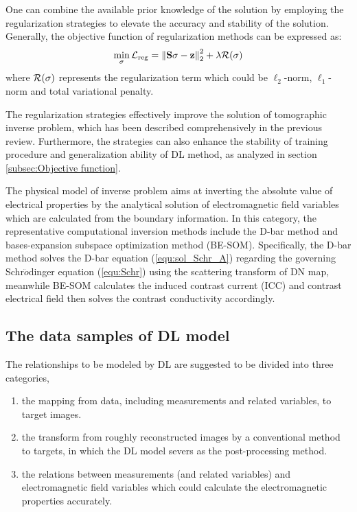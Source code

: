 One can combine the available prior knowledge of the solution by employing the regularization strategies to elevate the accuracy and stability of the solution.
Generally, the objective function of regularization methods can be expressed as:
\begin{equation}\label{equ:regularization_gen}
\mathop {\min }\limits_\sigma  {\cal{L}_{{\rm{reg}}}}{\rm{ }} = \left\| {{\bf{S}}\sigma  - {\bf{z}}} \right\|_2^2 + \lambda \cal{R}(\sigma )
\end{equation}
where $ \cal{R}(\sigma )$ represents the regularization term which could be ${\ell}_2$-norm, ${\ell}_1$-norm and total variational penalty.

The regularization strategies effectively improve the solution of tomographic inverse problem, which has been described comprehensively in the previous review\cite{Cui2016A}.
Furthermore, the strategies can also enhance the stability of training procedure and generalization ability of DL method, as analyzed in section \ref{subsec:Objective function}.

The physical model of inverse problem aims at inverting the absolute value of electrical properties by the analytical solution of electromagnetic field variables which are calculated from the boundary information.
In this category, the representative computational inversion methods include the D-bar method and bases-expansion subspace optimization method (BE-SOM)\cite{Wei2019Dominant}.
Specifically, the D-bar method solves the D-bar equation (\ref{equ:sol_Schr_A}) regarding the governing Schr$\ddot{o}$dinger equation (\ref{equ:Schr}) using the scattering transform of DN map, meanwhile BE-SOM calculates the induced contrast current (ICC) and contrast electrical field\cite{Wei2020Induced} then solves the contrast conductivity accordingly.

\subsection{The data samples of DL model}
\label{subsec:The data samples of DL model}

The relationships to be modeled by DL are suggested to be divided into three categories,
\begin{enumerate}
  \item the mapping from data, including measurements and related variables, to target images.
  \item the transform from roughly reconstructed images by a conventional method to targets, in which the DL model severs as the post-processing method.
  \item the relations between measurements (and related variables) and electromagnetic field variables which could calculate the electromagnetic properties accurately.
\end{enumerate}

